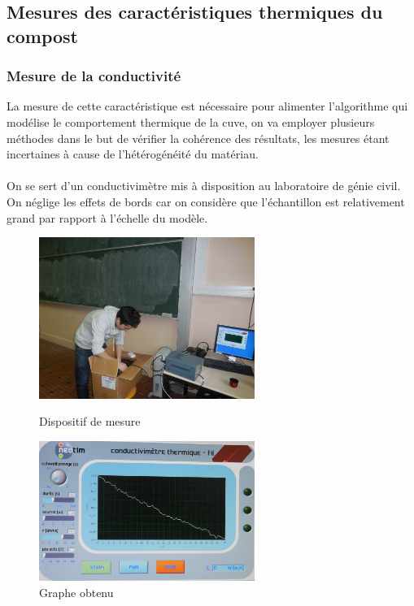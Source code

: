\documentclass[../PS6_RapportFinal.tex]{subfiles}
\begin{document}
\graphicspath{{img/}{tex/img/}}

\subsection{Mesures des caractéristiques thermiques du compost}
\label{mesurecaracteristiques}

\subsubsection{Mesure de la conductivité}

La mesure de cette caractéristique est nécessaire pour alimenter l'algorithme qui modélise le comportement thermique de la cuve, on va employer plusieurs méthodes dans le but de vérifier la cohérence des résultats, les mesures étant incertaines à cause de l'hétérogénéité du matériau.


\paragraph{}
On se sert d'un conductivimètre mis à disposition au laboratoire de génie civil. On néglige les effets de bords car on considère que l'échantillon est relativement grand par rapport à l'échelle du modèle.


\begin{figure}[h]
\centering

\begin{minipage}[h]{7cm}
\centering
\includegraphics[width=7cm]{2_3_ConductivimetreA.jpg}
\caption{Dispositif de mesure}
\end{minipage}
\hfill
\begin{minipage}[h]{7cm}
\centering
\includegraphics[width=7cm]{2_3_ConductivimetreB.jpg}
\caption{Graphe obtenu}
\end{minipage}

\label{mesure_conductivimetre}
\end{figure}
\end{document}
